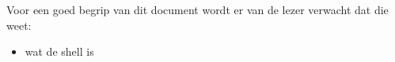 Voor een goed begrip van dit document wordt er van de lezer verwacht dat die weet:
\begin{itemize}
\item wat de shell is
\end{itemize}

